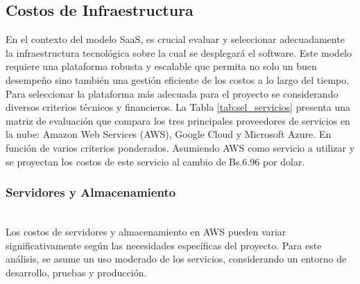 \subsection{Costos de Infraestructura}

En el contexto del modelo SaaS, es crucial evaluar y seleccionar adecuadamente la infraestructura tecnológica sobre la cual se desplegará el software. Este modelo requiere una plataforma robusta y escalable que permita no solo un buen desempeño sino también una gestión eficiente de los costos a lo largo del tiempo. Para seleccionar la plataforma más adecuada para el proyecto se considerando diversos criterios técnicos y financieros. La Tabla \ref{tab:sel_servicios} presenta una matriz de evaluación que compara los tres principales proveedores de servicios en la nube: Amazon Web Services (AWS), Google Cloud y Microsoft Azure. En función de varios criterios ponderados. Asumiendo AWS como servicio a utilizar y se proyectan los costos de este servicio al cambio de Bs.6.96 por dolar.



\subsubsection{Servidores y Almacenamiento}\hfill\\ 
\indent
Los costos de servidores y almacenamiento en AWS pueden variar significativamente según las necesidades específicas del proyecto. Para este análisis, se asume un uso moderado de los servicios, considerando un entorno de desarrollo, pruebas y producción. 

